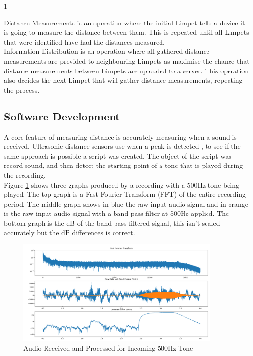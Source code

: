 1\documentclass{article}
\begin{document}
Distance Measurements is an operation where the initial Limpet tells a device it is going to measure the distance between them. This is repeated until all Limpets that were identified have had the distances measured.\\

Information Distribution is an operation where all gathered distance measurements are provided to neighbouring Limpets as maximise the chance that distance measurements between Limpets are uploaded to a server. This operation also decides the next Limpet that will gather distance measurements, repeating the process.\\
\subsection{Software Development}
A core feature of measuring distance is accurately measuring when a sound is received. Ultrasonic distance sensors use when a peak is detected \cite{toa_akeem_2020}, to see if the same approach is possible a script was created. The object of the script was record sound, and then detect the starting point of a tone that is played during the recording.\\

Figure \ref{fig:pulse500} shows three graphs produced by a recording with a 500Hz tone being played. The top graph is a Fast Fourier Transform (FFT) of the entire recording period. The middle graph shows in blue the raw input audio signal and in orange is the raw input audio signal with a band-pass filter at 500Hz applied. The bottom graph is the dB of the band-pass filtered signal, this isn't scaled accurately but the dB differences is correct.

\begin{figure}[H]
	\centering
	\noindent\includegraphics[width=0.9\textwidth]{images/Pulse500Hz}
	\caption{Audio Received and Processed for Incoming 500Hz Tone}
	\label{fig:pulse500}
\end{figure}
\end{document}
